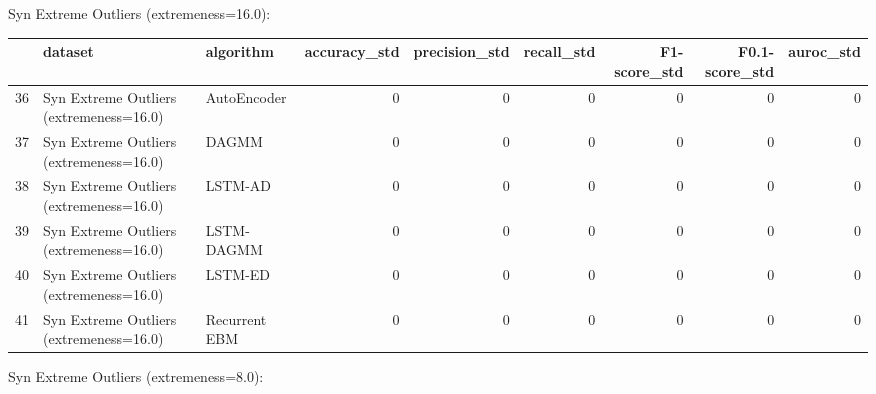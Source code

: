 Syn Extreme Outliers (extremeness=16.0):

\begin{tabular}{rllrrrrrr}
\hline
    & dataset                                 & algorithm     &   accuracy\_std &   precision\_std &   recall\_std &   F1-score\_std &   F0.1-score\_std &   auroc\_std \\
\hline
 36 & Syn Extreme Outliers (extremeness=16.0) & AutoEncoder   &              0 &               0 &            0 &              0 &                0 &           0 \\
 37 & Syn Extreme Outliers (extremeness=16.0) & DAGMM         &              0 &               0 &            0 &              0 &                0 &           0 \\
 38 & Syn Extreme Outliers (extremeness=16.0) & LSTM-AD       &              0 &               0 &            0 &              0 &                0 &           0 \\
 39 & Syn Extreme Outliers (extremeness=16.0) & LSTM-DAGMM    &              0 &               0 &            0 &              0 &                0 &           0 \\
 40 & Syn Extreme Outliers (extremeness=16.0) & LSTM-ED       &              0 &               0 &            0 &              0 &                0 &           0 \\
 41 & Syn Extreme Outliers (extremeness=16.0) & Recurrent EBM &              0 &               0 &            0 &              0 &                0 &           0 \\
\hline
\end{tabular}

Syn Extreme Outliers (extremeness=8.0):

